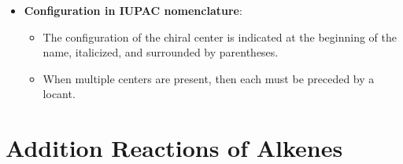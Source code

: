 \documentclass{inVerba-notes}
\begin{document}
\begin{itemize}
\begin{itemize}
    \bigskip

    \item \textbf{Configuration in IUPAC nomenclature}:
    \begin{itemize}
        \item The configuration of the chiral center is indicated at the beginning of the name, italicized, and surrounded by parentheses.
        \item When multiple centers are present, then each must be preceded by a locant.
    \end{itemize}
  \end{itemize}
\end{itemize}

\section{Addition Reactions of Alkenes}\label{Addition Reactions of Alkenes}
\end{document}
